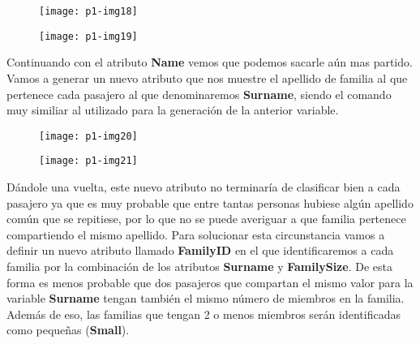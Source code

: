 \documentclass[10pt]{article}
\begin{document}
\begin{figure}[H]
	\begin{center}
 		\texttt{[image: p1-img18]}
	\end{center} 
\end{figure}

\begin{figure}[H]
	\begin{center}
 		\texttt{[image: p1-img19]}
	\end{center} 
\end{figure}  


Continuando con el atributo \textbf{Name} vemos que podemos sacarle aún mas partido. Vamos a generar un nuevo atributo que nos muestre el apellido de familia al que pertenece cada pasajero al que denominaremos \textbf{Surname}, siendo el comando muy similiar al utilizado para la generación de la anterior variable. \\

\begin{figure}[H]
	\begin{center}
 		\texttt{[image: p1-img20]}
	\end{center} 
\end{figure}

\begin{figure}[H]
	\begin{center}
 		\texttt{[image: p1-img21]}
	\end{center} 
\end{figure} 

Dándole una vuelta, este nuevo atributo no terminaría de clasificar bien a cada pasajero ya que es muy probable que entre tantas personas hubiese algún apellido común que se repitiese, por lo que no se puede averiguar a que familia pertenece compartiendo el mismo apellido. Para solucionar esta circunstancia vamos a definir un nuevo atributo llamado \textbf{FamilyID} en el que identificaremos a cada familia por la combinación de los atributos \textbf{Surname} y \textbf{FamilySize}. De esta forma es menos probable que dos pasajeros que compartan el mismo valor para la variable \textbf{Surname} tengan también el mismo número de miembros en la familia. Además de eso, las familias que tengan 2 o menos miembros serán identificadas como pequeñas (\textbf{Small}).\\
\end{document}
